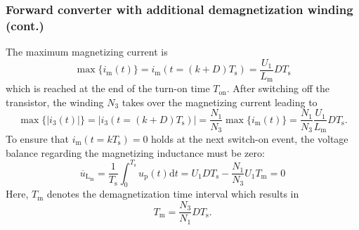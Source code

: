 \begin{frame}
    \frametitle{Forward converter with additional demagnetization winding (cont.)}
    The maximum magnetizing current is
    \begin{equation}
        \max\{i_\mathrm{m}(t)\} = i_\mathrm{m}(t=(k+D)T_\mathrm{s}) = \frac{U_1}{L_\mathrm{m}}DT_\mathrm{s}
    \end{equation}
    which is reached at the end of the turn-on time $T_\mathrm{on}$. After switching off the transistor, the winding $N_3$ takes over the magnetizing current leading to
    \begin{equation}
        \max\{|i_\mathrm{3}(t)|\} = |i_3(t=(k+D)T_\mathrm{s})| = \frac{N_1}{N_3}\max\{i_\mathrm{m}(t)\} = \frac{N_1}{N_3}\frac{U_1}{L_\mathrm{m}}DT_\mathrm{s}.
    \end{equation}
    To ensure that $i_\mathrm{m}(t=kT_\mathrm{s})=0$ holds at the next switch-on event, the voltage balance regarding the magnetizing inductance must be zero:
    \begin{equation}
        \overline{u}_\mathrm{L_\mathrm{m}} = \frac{1}{T_\mathrm{s}}\int_{0}^{T_\mathrm{s}}u_\mathrm{p}(t)\mathrm{d}t = U_1 D T_\mathrm{s} - \frac{N_1}{N_3} U_1  T_\mathrm{m} =0
    \end{equation}
    Here, $T_\mathrm{m}$ denotes the demagnetization time interval which results in 
    \begin{equation}
        T_\mathrm{m} = \frac{N_3}{N_1}DT_\mathrm{s}.
        \label{eq:forward_converter_demagnetization_time_interval}
    \end{equation}
\end{frame}

